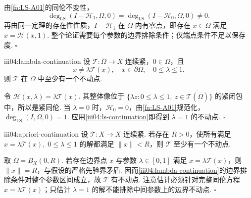 \begin{FAProof}
由\autoref{fa:LS-A01}的同伦不变性，
\[
\deg_{\mathrm{LS}}(I-\mathcal H_1,\Omega,0)
=
\deg_{\mathrm{LS}}(I-\mathcal H_0,\Omega,0)
\neq0.
\]
再由同一定理的存在性性质，\(\displaystyle I-\mathcal H_1\) 在 \(\displaystyle\Omega\) 内有零点，即存在 \(\displaystyle x\in\Omega\) 满足 \(\displaystyle x=\mathcal H(x,1)\). 整个论证需要每个参数的边界排除条件；仅端点条件不足以保存度. \hfill\(\square\)
\end{FAProof}

\begin{FACorollary}{iii04:lambda-continuation}
设 \(\displaystyle\mathcal T:\overline\Omega\to X\) 连续紧，\(\displaystyle0\in\Omega\)，且
\[
x\neq\lambda\mathcal T(x),
\quad
x\in\partial\Omega,
\quad
0\leqslant\lambda\leqslant1.
\]
则 \(\displaystyle\mathcal T\) 在 \(\displaystyle\Omega\) 中至少有一个不动点.
\end{FACorollary}

\begin{FAProof}
令 \(\displaystyle\mathcal H(x,\lambda)=\lambda\mathcal T(x)\). 其整体像位于 \(\displaystyle\{\lambda z:0\leqslant\lambda\leqslant1,\ z\in\overline{\mathcal T(\overline\Omega)}\}\) 的紧闭包中，所以是紧同伦. 当 \(\displaystyle\lambda=0\) 时，\(\displaystyle\mathcal H_0=0\)，由\autoref{fa:LS-A01}规范化，
\(\displaystyle \deg_{\mathrm{LS}}(I,\Omega,0)=1.\)
应用\autoref{iii04:ls-continuation}即得到 \(\displaystyle\lambda=1\) 的不动点. \hfill\(\square\)
\end{FAProof}

\begin{FACorollary}[A][先验界表述]{iii04:apriori-continuation}
设 \(\displaystyle\mathcal T:X\to X\) 连续紧. 若存在 \(\displaystyle R>0\)，使所有满足
\(\displaystyle x=\lambda\mathcal T(x), \; 0\leqslant\lambda\leqslant1\)
的解都满足 \(\displaystyle\|x\|<R\)，则 \(\displaystyle\mathcal T\) 至少有一个不动点.
\end{FACorollary}

\begin{FAProof}
取 \(\displaystyle\Omega=B_X(0,R)\). 若存在边界点 \(\displaystyle x\) 与参数 \(\displaystyle\lambda\in[0,1]\) 满足 \(\displaystyle x=\lambda\mathcal T(x)\)，则 \(\displaystyle\|x\|=R\)，与假设的严格先验界矛盾. 因而\autoref{iii04:lambda-continuation}的边界排除条件对整个参数区间成立，故 \(\displaystyle\mathcal T\) 有不动点. 注意估计必须针对完整同伦方程 \(\displaystyle x=\lambda\mathcal T(x)\)；只估计 \(\displaystyle\lambda=1\) 的解不能排除中间参数上的边界不动点. \hfill\(\square\)
\end{FAProof}

